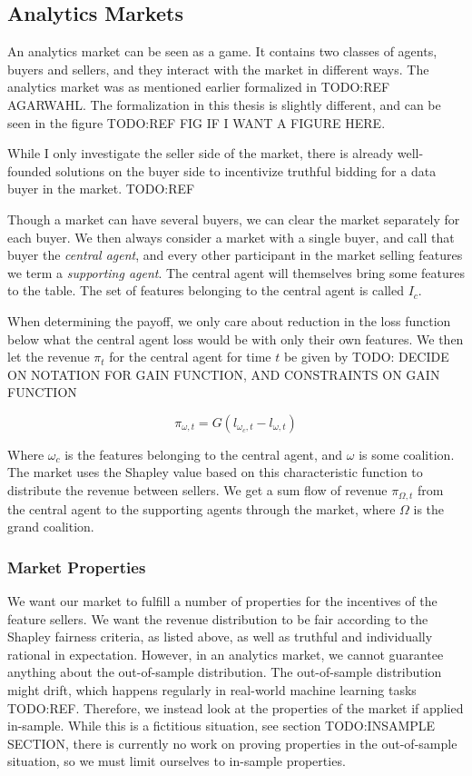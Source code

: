 \subsection{Analytics Markets}

An analytics market can be seen as a game. It contains two classes of agents,
buyers and sellers, and they interact with the market in different ways. The
analytics market was as mentioned earlier formalized in TODO:REF AGARWAHL. The
formalization in this thesis is slightly different, and can be seen in the
figure TODO:REF FIG IF I WANT A FIGURE HERE.

While I only investigate the seller side of the market, there is already
well-founded solutions on the buyer side to incentivize truthful bidding for a
data buyer in the market. TODO:REF

Though a market can have several buyers, we can clear the market separately for
each buyer. We then always consider a market with a single buyer, and call that
buyer the \emph{central agent}, and every other participant in the market
selling features we term a \emph{supporting agent}. The central agent will
themselves bring some features to the table. The set of features belonging to
the central agent is called $I_c$.


When determining the payoff, we only care about reduction in the loss function
below what the central agent loss would be with only their own features. We
then let the revenue $\pi_t$ for the central agent for time $t$ be given by
TODO: DECIDE ON NOTATION FOR GAIN FUNCTION, AND CONSTRAINTS ON GAIN FUNCTION

\begin{equation}
  \pi_{\omega,t} = G(l_{\omega_c, t} - l_{\omega, t})
\end{equation}

Where $\omega_c$ is the features belonging to the central agent, and $\omega$
is some coalition. The market uses the Shapley value based on this
characteristic function to distribute the revenue between sellers. We get a sum
flow of revenue $\pi_{\Omega,t}$ from the central agent to the supporting agents through
the market, where $\Omega$ is the grand coalition.

\subsubsection{Market Properties}

We want our market to fulfill a number of properties for the incentives of the
feature sellers. We want the revenue distribution to be fair according to the
Shapley fairness criteria, as listed above, as well as truthful and
individually rational in expectation. However, in an analytics market, we
cannot guarantee anything about the out-of-sample distribution. The
out-of-sample distribution might drift, which happens regularly in real-world
machine learning tasks TODO:REF. Therefore, we instead look at the properties
of the market if applied in-sample. While this is a fictitious situation, see
section TODO:INSAMPLE SECTION, there is currently no work on proving properties
in the out-of-sample situation, so we must limit ourselves to in-sample
properties.

